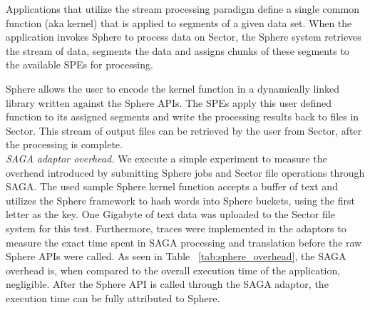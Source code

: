 \documentclass[3p,twocolumn]{elsarticle}
\begin{document}
Applications that utilize the stream processing paradigm define a
single common function (aka kernel) that is applied to segments of a
given data set.  When the application invokes Sphere to process data
on Sector, the Sphere system retrieves the stream of data, segments
the data and assigns chunks of these segments to the available SPEs
for processing.

Sphere allows the user to encode the kernel function in a dynamically
linked library written against the Sphere APIs.  The SPEs apply this
user defined function to its assigned segments and write the
processing results back to files in Sector.  This stream of output
files can be retrieved by the user from Sector, after the processing
is complete.\\


\textit{SAGA adaptor overhead.}
%
We execute a simple experiment to measure the overhead introduced by
submitting Sphere jobs and Sector file operations through SAGA.  The
used sample Sphere kernel function accepts a buffer of text and
utilizes the Sphere framework to hash words into Sphere buckets, using
the first letter as the key. One Gigabyte of text data was uploaded to
the Sector file system for this test.  Furthermore, traces were
implemented in the adaptors to measure the exact time spent in SAGA
processing and translation before the raw Sphere APIs were called.
As seen in Table ~\ref{tab:sphere_overhead}, the SAGA overhead
is, when compared to the overall execution time of the application,
negligible. After the Sphere API is called through the SAGA adaptor, 
the execution time can be fully attributed to Sphere. 




\end{document}
